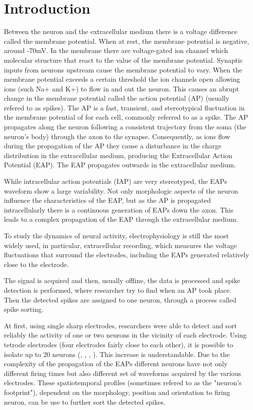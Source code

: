 \section{Introduction}
\label{sec:introduction}

Between the neuron and the extracellular medium there is a voltage difference called the membrane potential. When at rest, the membrane potential is negative, around -70mV.  In the membrane there are voltage-gated ion channel which molecular structure that react to the value of the membrane potential. Synaptic inputs from neurons upstream cause the membrane potential to vary. When the membrane potential exceeds a certain threshold the ion channels open allowing ions (such Na+ and K+) to flow in and out the neuron. This causes an abrupt change in the membrane potential called the action potential (AP) (usually refered to as spikes). The AP is a fast, transient, and stereotypical fluctuation in the membrane potential of for each cell, commonly referred to as a spike. The AP propagates along the neuron following a consistent trajectory from the soma (the neuron's body) through the axon to the synapse. 
Consequently, as ions flow during the propagation of the AP they cause a disturbance in the charge distribution in the extracellular medium, producing the Extracellular Action Potential (EAP). The EAP propagates outwards in the extracellular medium. \cite{kandel}

While intracellular action potentials (IAP) are very stereotyped, the EAPs waveform show a large variability. Not only morphologic aspects of the neuron influence the characteristics of the EAP, but as the AP is propagated intracellularly there is a continuous generation of EAPs down the axon. This leads to a complex propagation of the EAP through the extracellular medium. \cite{gold2007biophysics} \cite{pettersen2008amplitude}
 
To study the dynamics of neural activity, electrophysiology is still the most widely used, in particular, extracellular recording, which measures the voltage fluctuations that surround the electrodes, including the EAPs generated relatively close to the electrode.
 
The signal is acquired and then, usually offline, the data is processed and spike detection is performed, where researcher try to find when an AP took place. Then the detected spikes are assigned to one neuron, through a process called spike sorting.

At first, using single sharp electrodes, researchers were able to detect and sort reliably the activity of one or two neurons in the vicinity of each electrode. Using tetrode electrodes (four electrodes fairly close to each other), it is possible to isolate up to 20 neurons (\cite{mcnaughton1983stereotrode}, \cite{gray1995tetrodes}, \cite{wilson1993dynamics}, \cite{recce1989tetrode}). This increase is understandable. Due to the complexity of the propagation of the EAPs different neurons have not only different firing times but also different set of waveforms acquired by the various electrodes. These spatiotemporal profiles (sometimes refered to as the "neuron's footprint"), dependent on the morphology, position and orientation to firing neuron, can be use to further sort the detected spikes.  

